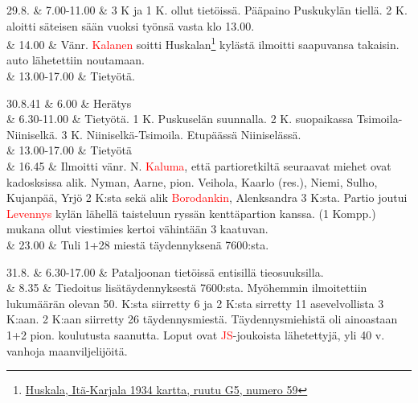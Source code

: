 \documentclass[11pt,a5paper,oneside]{book}
\begin{document}
29.8. & 7.00-11.00 & 3 K ja 1 K. ollut tietöissä. Pääpaino Puskukylän tiellä. 2 K. aloitti säteisen sään vuoksi työnsä vasta klo 13.00. \\

& 14.00 & Vänr. \textcolor{red}{Kalanen} soitti Huskalan\footnote{\href{https://www.google.fi/maps/place/\%D0\%93\%D1\%83\%CC\%81\%D1\%88\%D0\%BA\%D0\%B0\%D0\%BB\%D0\%B0,+Republic+of+Karelia,+Russia,+186016/@61.2176076,32.8546529,3626m/}{Huskala, Itä-Karjala 1934 kartta, ruutu G5, numero 59}} kylästä ilmoitti saapuvansa takaisin. auto lähetettiin noutamaan. \\

& 13.00-17.00 & Tietyötä. \\

\taulustop


30.8.41 & 6.00 & Herätys \\

& 6.30-11.00 & Tietyötä. 1 K. Puskuselän suunnalla. 2 K. suopaikassa Tsimoila-Niiniselkä. 3 K. Niiniselkä-Tsimoila. \newline Etupäässä Niiniselässä. \newline \\

& 13.00-17.00 & Tietyötä \\

& 16.45 & Ilmoitti vänr. N. \textcolor{red}{Kaluma}, että partioretkiltä seuraavat miehet ovat kadosksissa alik. Nyman, Aarne, pion. Veihola, Kaarlo (res.), Niemi, Sulho, Kujanpää, Yrjö 2 K:sta sekä alik \textcolor{red}{Borodankin}, Alenksandra 3 K:sta. Partio joutui \textcolor{red}{Levennys} kylän lähellä taisteluun ryssän kenttäpartion kanssa. \newline (1 Kompp.) mukana ollut viestimies kertoi vähintään 3 kaatuvan. \newline \\

& 23.00 & Tuli 1+28 miestä täydennyksenä 7600:sta. \\
\newpage

31.8. & 6.30-17.00 & Pataljoonan tietöissä entisillä tieosuuksilla. \\

& 8.35 & Tiedoitus lisätäydennyksestä 7600:sta. Myöhemmin ilmoitettiin lukumäärän olevan 50.  K:sta siirretty 6 ja 2 K:sta sirretty 11 asevelvollista 3 K:aan. 2 K:aan siirretty 26 täydennysmiestä. Täydennysmiehistä oli ainoastaan 1+2 pion. koulutusta saanutta. Loput ovat \textcolor{red}{JS}-joukoista lähetettyjä, yli 40 v. vanhoja maanviljelijöitä. \\
\end{document}
